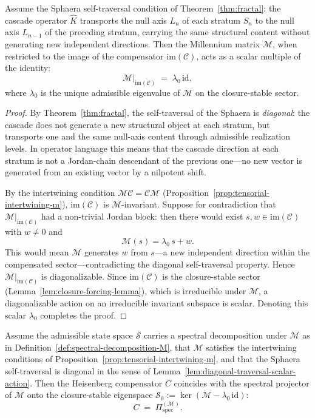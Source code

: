 \begin{lemma}
\label{lem:diagonal-traversal-scalar-action}
Assume the Sphaera self-traversal condition of Theorem~\ref{thm:fractal}:
the cascade operator $\hat{K}$ transports the null axis $L_n$ of each
stratum $S_n$ to the null axis $L_{n-1}$ of the preceding stratum,
carrying the same structural content without generating new independent
directions. Then the Millennium matrix $\mathcal{M}$, when restricted to
the image of the compensator $\mathrm{im}(\mathcal{C})$, acts as a scalar
multiple of the identity:
\[
  \mathcal{M}\big|_{\mathrm{im}(\mathcal{C})} \;=\; \lambda_0\,\mathrm{id},
\]
where $\lambda_0$ is the unique admissible eigenvalue of $\mathcal{M}$ on
the closure-stable sector.
\end{lemma}

\begin{proof}
By Theorem~\ref{thm:fractal}, the self-traversal of the Sphaera is
\emph{diagonal}: the cascade does not generate a new structural object at
each stratum, but transports one and the same null-axis content through
admissible realization levels. In operator language this means that the
cascade direction at each stratum is not a Jordan-chain descendant of the
previous one---no new vector is generated from an existing vector by a
nilpotent shift.

By the intertwining condition $\mathcal{M}\mathcal{C} = \mathcal{C}\mathcal{M}$
(Proposition~\ref{prop:tensorial-intertwining-m}), $\mathrm{im}(\mathcal{C})$
is $\mathcal{M}$-invariant. Suppose for contradiction that
$\mathcal{M}|_{\mathrm{im}(\mathcal{C})}$ had a non-trivial Jordan block:
then there would exist $s,w \in \mathrm{im}(\mathcal{C})$ with $w\neq 0$ and
\[
  \mathcal{M}(s) = \lambda_0\,s + w.
\]
This would mean $\mathcal{M}$ generates $w$ from $s$---a new independent
direction within the compensated sector---contradicting the diagonal
self-traversal property. Hence $\mathcal{M}|_{\mathrm{im}(\mathcal{C})}$
is diagonalizable. Since $\mathrm{im}(\mathcal{C})$ is the closure-stable
sector (Lemma~\ref{lem:closure-forcing-lemma}), which is irreducible under
$\mathcal{M}$, a diagonalizable action on an irreducible invariant subspace
is scalar. Denoting this scalar $\lambda_0$ completes the proof.
\end{proof}

\begin{theorem}
\label{thm:hc-spectral-projector}
Assume the admissible state space $\mathcal{S}$ carries a spectral
decomposition under $\mathcal{M}$ as in
Definition~\ref{def:spectral-decomposition-M}, that $\mathcal{M}$ satisfies
the intertwining conditions of Proposition~\ref{prop:tensorial-intertwining-m},
and that the Sphaera self-traversal is diagonal in the sense of
Lemma~\ref{lem:diagonal-traversal-scalar-action}. Then the Heisenberg
compensator $C$ coincides with the spectral projector of $\mathcal{M}$
onto the closure-stable eigenspace $\mathcal{S}_0 :=
\ker(\mathcal{M} - \lambda_0\,\mathrm{id})$:
\[
  C \;=\; \Pi^{(\mathcal{M})}_{\mathrm{spec}}.
\]
\end{theorem}

